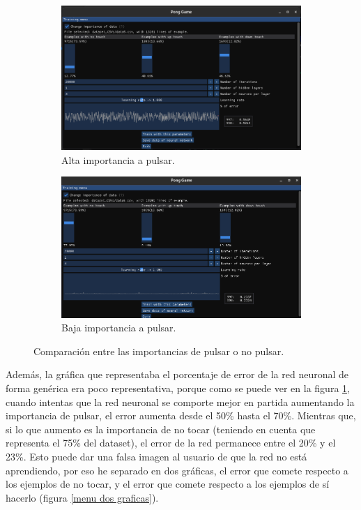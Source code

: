 \begin{figure}[h]
	\centering
	\begin{subfigure}[h]{\textwidth}
		\centering
		\includegraphics[width=15cm]{archivos/imagenes/menu-de-entrenamiento-alto-error.png}
		\caption{Alta importancia a pulsar.}
	\end{subfigure}

	\begin{subfigure}[h]{\textwidth}
		\centering
		\includegraphics[width=15cm]{archivos/imagenes/menu-de-entrenamiento-bajo-error.png}
		\caption{Baja importancia a pulsar.}
	\end{subfigure}
	\caption{Comparación entre las importancias de pulsar o no pulsar.}
	\label{Comparacion alto vs bajo error}
\end{figure}

Además, la gráfica que representaba el porcentaje de error de la red neuronal de forma genérica era poco representativa, porque como se puede ver en la figura \ref{Comparacion alto vs bajo error}, cuando intentas que la red neuronal se comporte mejor en partida aumentando la importancia de pulsar, el error aumenta desde el 50\% hasta el 70\%. Mientras que, si lo que aumento es la importancia de no tocar (teniendo en cuenta que representa el 75\% del dataset), el error de la red permanece entre el 20\% y el 23\%. Esto puede dar una falsa imagen al usuario de que la red no está aprendiendo, por eso he separado en dos gráficas, el error que comete respecto a los ejemplos de no tocar, y el error que comete respecto a los ejemplos de sí hacerlo (figura \ref{menu dos graficas}).

